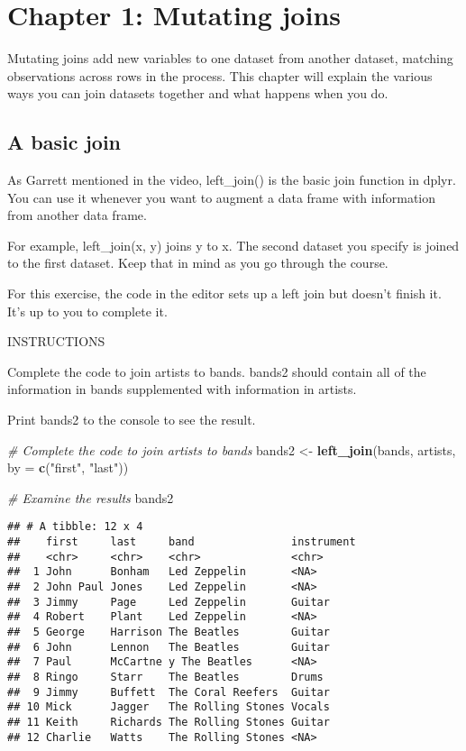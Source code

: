 \documentclass[]{article}
\newenvironment{Shaded}{\begin{snugshade}}{\end{snugshade}}
\newcommand{\KeywordTok}[1]{\textcolor[rgb]{0.13,0.29,0.53}{\textbf{#1}}}
\newcommand{\DataTypeTok}[1]{\textcolor[rgb]{0.13,0.29,0.53}{#1}}
\newcommand{\StringTok}[1]{\textcolor[rgb]{0.31,0.60,0.02}{#1}}
\newcommand{\CommentTok}[1]{\textcolor[rgb]{0.56,0.35,0.01}{\textit{#1}}}
\newcommand{\NormalTok}[1]{#1}
\begin{document}
\section{Chapter 1: Mutating joins}\label{chapter-1-mutating-joins}

Mutating joins add new variables to one dataset from another dataset,
matching observations across rows in the process. This chapter will
explain the various ways you can join datasets together and what happens
when you do.

\subsection{A basic join}\label{a-basic-join}

As Garrett mentioned in the video, left\_join() is the basic join
function in dplyr. You can use it whenever you want to augment a data
frame with information from another data frame.

For example, left\_join(x, y) joins y to x. The second dataset you
specify is joined to the first dataset. Keep that in mind as you go
through the course.

For this exercise, the code in the editor sets up a left join but
doesn't finish it. It's up to you to complete it.

INSTRUCTIONS

Complete the code to join artists to bands. bands2 should contain all of
the information in bands supplemented with information in artists.

Print bands2 to the console to see the result.

\begin{Shaded}
\begin{Highlighting}[]
\CommentTok{# Complete the code to join artists to bands}
\NormalTok{bands2 <-}\StringTok{ }\KeywordTok{left_join}\NormalTok{(bands, artists, }\DataTypeTok{by =} \KeywordTok{c}\NormalTok{(}\StringTok{"first"}\NormalTok{, }\StringTok{"last"}\NormalTok{))}

\CommentTok{# Examine the results}
\NormalTok{bands2}
\end{Highlighting}
\end{Shaded}

\begin{verbatim}
## # A tibble: 12 x 4
##    first     last     band               instrument
##    <chr>     <chr>    <chr>              <chr>     
##  1 John      Bonham   Led Zeppelin       <NA>      
##  2 John Paul Jones    Led Zeppelin       <NA>      
##  3 Jimmy     Page     Led Zeppelin       Guitar    
##  4 Robert    Plant    Led Zeppelin       <NA>      
##  5 George    Harrison The Beatles        Guitar    
##  6 John      Lennon   The Beatles        Guitar    
##  7 Paul      McCartne y The Beatles      <NA>      
##  8 Ringo     Starr    The Beatles        Drums     
##  9 Jimmy     Buffett  The Coral Reefers  Guitar    
## 10 Mick      Jagger   The Rolling Stones Vocals    
## 11 Keith     Richards The Rolling Stones Guitar    
## 12 Charlie   Watts    The Rolling Stones <NA>
\end{verbatim}
\end{document}
